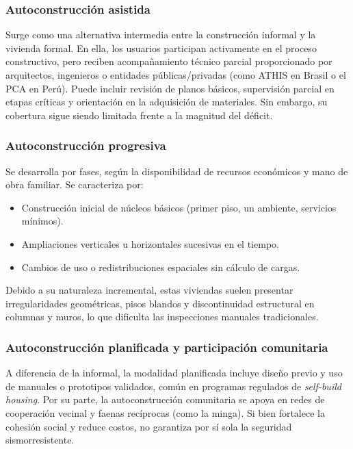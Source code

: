 \documentclass[12pt,oneside]{report}
\begin{document}
\subsubsection{Autoconstrucción asistida}
Surge como una alternativa intermedia entre la construcción informal y la vivienda formal. En ella, los usuarios participan activamente en el proceso constructivo, pero reciben acompañamiento técnico parcial proporcionado por arquitectos, ingenieros o entidades públicas/privadas (como ATHIS en Brasil o el PCA en Perú). Puede incluir revisión de planos básicos, supervisión parcial en etapas críticas y orientación en la adquisición de materiales. Sin embargo, su cobertura sigue siendo limitada frente a la magnitud del déficit.\par

\subsubsection{Autoconstrucción progresiva}
Se desarrolla por fases, según la disponibilidad de recursos económicos y mano de obra familiar. Se caracteriza por:\par
\begin{itemize}
  \item Construcción inicial de núcleos básicos (primer piso, un ambiente, servicios mínimos).
  \item Ampliaciones verticales u horizontales sucesivas en el tiempo.
  \item Cambios de uso o redistribuciones espaciales sin cálculo de cargas.
\end{itemize}
Debido a su naturaleza incremental, estas viviendas suelen presentar irregularidades geométricas, pisos blandos y discontinuidad estructural en columnas y muros, lo que dificulta las inspecciones manuales tradicionales.\par

\subsubsection{Autoconstrucción planificada y participación comunitaria}
A diferencia de la informal, la modalidad planificada incluye diseño previo y uso de manuales o prototipos validados, común en programas regulados de \textit{self-build housing}. Por su parte, la autoconstrucción comunitaria se apoya en redes de cooperación vecinal y faenas recíprocas (como la minga). Si bien fortalece la cohesión social y reduce costos, no garantiza por sí sola la seguridad sismorresistente.\par
\end{document}
